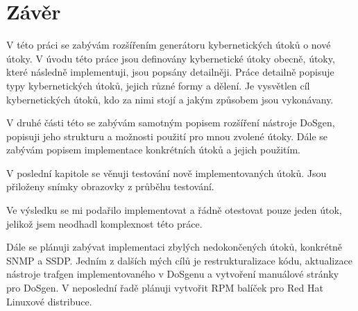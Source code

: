 \chapter{Závěr}
V této práci se zabývám rozšířením generátoru kybernetických útoků o nové útoky. V úvodu této práce jsou definovány kybernetické útoky obecně, útoky, které následně implementuji, jsou popsány detailněji. Práce detailně popisuje typy kybernetických útoků, jejich různé formy a dělení. Je vysvětlen cíl kybernetických útoků, kdo za nimi stojí a jakým způsobem jsou vykonávany.

V druhé části této se zabývám samotným popisem rozšíření nástroje DoSgen, popisuji jeho strukturu a možnosti použití pro mnou zvolené útoky. Dále se zabývám popisem implementace konkrétních útoků a jejich použitím.

V poslední kapitole se věnuji testování nově implementovaných útoků. Jsou přiloženy snímky obrazovky z průběhu testování.

Ve výsledku se mi podařilo implementovat a řádně otestovat pouze jeden útok, jelikož jsem neodhadl komplexnost této práce.

Dále se plánuji zabývat implementaci zbylých nedokončených útoků, konkrétně SNMP a SSDP. Jedním z dalších mých cílů je restrukturalizace kódu, aktualizace nástroje trafgen implementovaného v DoSgenu a vytvoření manuálové stránky pro DoSgen. V neposlední řadě plánuji vytvořit RPM balíček pro Red Hat Linuxové distribuce.